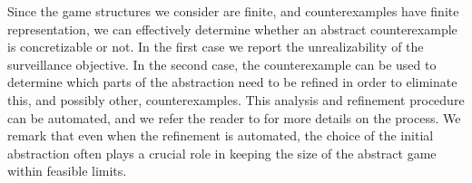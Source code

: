 Since the game structures we consider are finite, and counterexamples have finite representation, we can effectively determine whether an abstract counterexample is concretizable or not. In the first case we report the unrealizability of the surveillance objective. In the second case, the counterexample can be used to determine which parts of the abstraction need to be refined in order to eliminate this, and possibly other, counterexamples. This analysis and refinement procedure can be automated, and we refer the reader to \cite{arxiv} for more details on the process. We remark that even when the refinement is automated, the choice of the initial abstraction often plays a crucial role in keeping the size of the abstract game within feasible limits.
